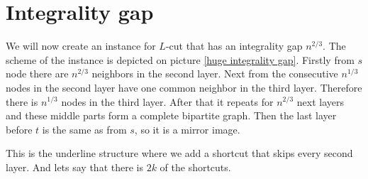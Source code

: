 \section{Integrality gap}

We will now create an instance for $L$-cut that has an integrality gap $n^{2/3}$. The scheme of the instance is depicted on picture \ref{huge integrality gap}. Firstly from $s$ node there are $n^{2/3}$ neighbors in the second layer. Next from the \textcolor{myviolet}{consecutive $n^{1/3}$ nodes} in the second layer have one common neighbor in the third layer. Therefore there is $n^{1/3}$ nodes in the third layer. After that it repeats for $n^{2/3}$ next layers and these middle parts form a \textcolor{myblue}{complete bipartite graph}. Then the last layer before $t$ is the same as from $s$, so it is a mirror image.

This is the underline structure where we add a \textcolor{myorange}{shortcut} that skips every second layer. And lets say that there is $2k$ of the shortcuts.

